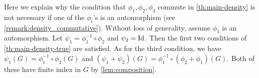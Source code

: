 \begin{remark} \label{rk:auto}
Here we explain why the condition that $\phi_1, \phi_2, \phi_3$ commute in \cref{th:main-density} is not necessary if one of the $\phi_i$'s is an automorphism (see \cref{remark:density_commutative}). Without loss of generality, assume $\phi_1$ is an automorphism. Let $\psi_1 = \phi_1^{-1} \circ \phi_2$ and $\psi_2 = \textup{Id}$. Then the first two conditions of \cref{th:main-density-true} are satisfied. As for the third condition, we have $\psi_1(G) = \phi_1^{-1} \circ \phi_2(G)$ and $(\psi_1 + \psi_2)(G) = \phi_1^{-1} \circ (\phi_2 + \phi_1) (G)$. Both of these have finite index in $G$ by \cref{lem:composition}.
\end{remark}

